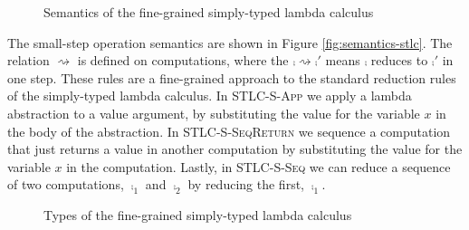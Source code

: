 {\begin{figure}
\caption{Semantics of the fine-grained simply-typed lambda calculus}
\centering
{}
\end{figure}

The small-step operation semantics are shown in Figure \ref{fig:semantics-stlc}.
The relation $\rightsquigarrow$ is defined on computations, where the $\comp \rightsquigarrow \comp'$ means $\comp$ reduces to $\comp'$ in one step.
These rules are a fine-grained approach to the standard reduction rules of the simply-typed lambda calculus.
In \textsc{STLC-S-App} we apply a lambda abstraction to a value argument, by substituting the value for the variable $x$ in the body of the abstraction.
In \textsc{STLC-S-SeqReturn} we sequence a computation that just returns a value in another computation by substituting the value for the variable $x$ in the computation.
Lastly, in \textsc{STLC-S-Seq} we can reduce a sequence of two computations, $\comp_1$ and $\comp_2$ by reducing the first, $\comp_1$.


\begin{figure}
\caption{Types of the fine-grained simply-typed lambda calculus}
\centering
{}
\end{figure}

}
